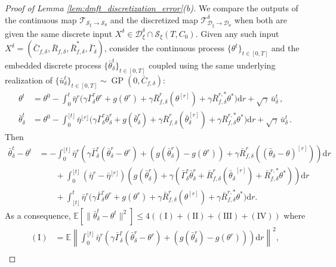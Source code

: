 \documentclass[11pt,letterpaper,reqno]{amsart}
\theoremstyle{definition}
\def\d{\mathrm{d}}
\def\E{\mathbb{E}}
\def\GP{\operatorname{GP}}
\def\cS{\mathcal{S}}
\def\trsfrmA{\mathcal{T}_{\mathcal{S}_\xi \to {\mathcal{S}}_\theta}}
\def\trsfrmDA{\mathcal{T}^\delta_{\mathcal{D}_\xi \to {\mathcal{D}}_\theta}}
\newcommand{\flr}[1]{{\lfloor {#1} \rfloor}}
\newcommand{\norm}[1]{\|#1\|}
\newcommand{\prn}[1]{\left({#1}\right)} %
\newcommand{\brk}[1]{\left[{#1}\right]} %
\begin{document}
\begin{proof}[Proof of Lemma \ref{lem:dmft_discretization_error}(b)]
We compare the outputs of the continuous map $\trsfrmA$
and the discretized map $\trsfrmDA$ when both are
given the same discrete input $X^\delta \in \mathcal D_\xi^\delta \cap
\cS_\xi(T,C_0)$. Given any such input
$X^\delta=(\bar C_{f,\delta},\bar R_{f,\delta},\bar
R_{f,\delta}^*,\bar\Gamma_\delta)$, consider the continuous
process $\{\theta^t\}_{t \in [0,T]}$ and the embedded discrete process
$\{\bar\theta^t_\delta\}_{t \in [0,T]}$ coupled using the same underlying
realization of $\{\bar u_\delta^t\}_{t \in [0,T]} \sim \GP(0,\bar C_{f,\delta})$:
\begin{align*}
    \theta^t&=\theta^0-\int_0^t \bar\eta^r \Big({\gamma}\bar\Gamma^r_\delta
\theta^r+g(\theta^r)+{\gamma}\bar R_{f,\delta}^r(\theta^{[r]})+
{\gamma}\bar R_{f,\delta}^{r,*}\theta^*\Big)\d r+\sqrt{\gamma}\,\bar u^{t}_\delta\, , \\
    \bar\theta^t_\delta&=\theta^0-\int_0^{\flr{t}} \bar\eta^{\flr{r}} \Big({\gamma}\bar\Gamma^r_\delta
\bar\theta^r_\delta+g(\bar\theta^r_\delta)+{\gamma}\bar R_{f,\delta}^r(\bar\theta^{[r]}_\delta)+
{\gamma}\bar R_{f,\delta}^{r,*}\theta^*\Big)\d r+\sqrt{\gamma}\,\bar u^t_\delta \, .
\end{align*}
Then
\begin{align*}
    \bar\theta^t_\delta - \theta^t &= - \int_0^{\flr{t}} \bar\eta^r \prn{{\gamma}\bar\Gamma_\delta^{r}(\bar \theta^{r}_\delta - \theta^r)+ (g(\bar \theta^{r}_\delta)-g(\theta^r)) + {\gamma} \bar R_{f,\delta}^{r}\prn{\prn{\bar\theta_\delta - \theta}^{[r]}} } \d r \nonumber\\
    &\qquad+ \int_0^{\flr{t}} \prn{\bar\eta^r - \bar\eta^{\flr{r}}}\prn{g(\bar \theta^{r}_\delta) +  {\gamma}\prn{\bar\Gamma_\delta^{r}\bar \theta^{r}_\delta+ \bar R_{f,\delta}^{r}\prn{{\bar\theta_\delta}^{[r]}} + \bar R_{f,\delta}^{r,*}\theta^* }} \d r \nonumber\\
    &\qquad+ \int_{\flr{t}}^t \bar\eta^r \Big({\gamma}\bar\Gamma^r_\delta
\theta^r+g(\theta^r)+{\gamma}\bar R_{f,\delta}^r(\theta^{[r]})+
{\gamma}\bar R_{f,\delta}^{r,*}\theta^*\Big)\d r.
\end{align*}
As a consequence, $\E\brk{\norm{\bar\theta^t_\delta - \theta^t}^2} \leq
4((\mathrm{I})+(\mathrm{II})+(\mathrm{III})+(\mathrm{IV}))$ where
\begin{align*}
(\mathrm{I})&=\E\left\|\int_0^{\flr{t}}
\bar\eta^r \prn{{\gamma}\bar\Gamma_\delta^{r}(\bar \theta^{r}_\delta -
\theta^r)+ (g(\bar \theta^{r}_\delta)-g(\theta^r))}\d r\right\|^2,\\

\end{align*}
\end{proof}
\end{document}
